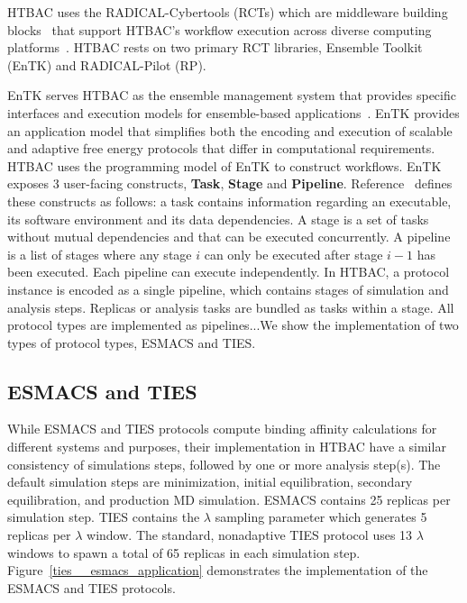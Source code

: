 
HTBAC uses the RADICAL-Cybertools (RCTs) which are middleware building 
blocks~\cite{review_bb_2016} that support HTBAC's workflow execution across 
diverse computing platforms~\cite{turilli2017comprehensive}. HTBAC rests on two 
primary RCT libraries, Ensemble Toolkit (EnTK) and RADICAL-Pilot (RP).

EnTK serves HTBAC as the ensemble management system that provides specific 
interfaces and execution models for ensemble-based 
applications~\cite{power-of-many17}. EnTK provides an application model that 
simplifies both the encoding and execution of scalable and adaptive free energy 
protocols that differ in computational requirements. HTBAC uses the programming 
model of EnTK to construct workflows. EnTK exposes 3 
user-facing constructs, \textbf{Task}, \textbf{Stage} and \textbf{Pipeline}. 
Reference~\cite{power-of-many17} defines these constructs as follows: a task 
contains information regarding an executable, its software environment and its 
data dependencies. A stage is a set of tasks without mutual dependencies and 
that can be executed concurrently. A pipeline is a list of stages where any 
stage $i$ can only be executed after stage $i - 1$ has been executed. Each 
pipeline can execute independently. In HTBAC, a protocol instance is encoded as 
a single pipeline, which contains stages of simulation and analysis steps. 
Replicas or analysis tasks are bundled as tasks within a stage. All protocol 
types are implemented as pipelines...We show the implementation of two types of
protocol types, ESMACS and TIES.

\subsection{ESMACS and TIES}

While ESMACS and TIES protocols compute binding affinity calculations for 
different systems and purposes, their implementation in HTBAC have a similar 
consistency of simulations steps, followed by one or more analysis step(s). The 
default simulation steps are minimization, initial equilibration, secondary 
equilibration, and production MD simulation. ESMACS contains 25 replicas per
simulation step. TIES contains the $\lambda$ sampling parameter which generates 
5 replicas per $\lambda$ window. The standard, nonadaptive TIES protocol uses 13 
$\lambda$ windows to spawn a total of 65 replicas in each simulation step. 
Figure~\ref{ties__esmacs_application} demonstrates the implementation of 
the ESMACS and TIES protocols. 

